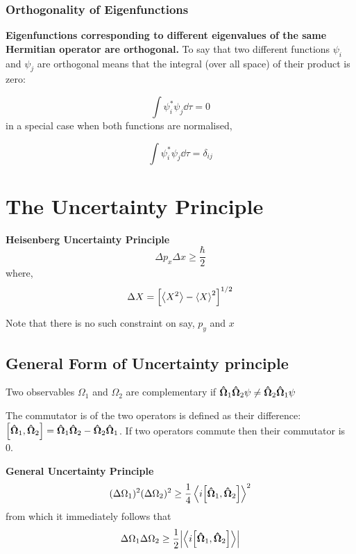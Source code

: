 \documentclass[11pt]{article}
\theoremstyle{definition}
\begin{document}
\subsubsection{Orthogonality of Eigenfunctions}
\textbf{Eigenfunctions corresponding to different eigenvalues of the same Hermitian operator are orthogonal.} To say that two different functions $\psi_i$ and $\psi_j$ are orthogonal means that the integral (over all space) of their product is zero:

\begin{equation*}
    \int \psi_i ^* \psi_j \dd{\tau} = 0
\end{equation*}
in a special case when both functions are normalised,

\begin{equation*}
    \int \psi_i ^* \psi_j \dd{\tau} = \delta_{ij}
\end{equation*}

\section{The Uncertainty Principle}
\begin{shaded}
\textbf{Heisenberg Uncertainty Principle}
\begin{equation*}
    \Delta p_x \Delta x \geq \frac{\hbar}{2}
\end{equation*}
where,
\begin{gather*}
     \Delta X = \left[\expval{X^2} - \expval{X}^2 \right]^{1/2}
\end{gather*}

Note that there is no such constraint on say, $p_y$ and $x$
\end{shaded}

\subsection{General Form of Uncertainty principle}

Two observables $\Omega_1$ and $\Omega_2$ are complementary if $\vectorunit{\Omega}_1 \vectorunit{\Omega}_2 \psi \neq  \vectorunit{\Omega}_2 \vectorunit{\Omega}_1 \psi$

The commutator is of the two operators is defined as their difference: $\comm{\vectorunit{\Omega}_1}{\vectorunit{\Omega}_2} = \vectorunit{\Omega}_1\vectorunit{\Omega}_2 - \vectorunit{\Omega}_2\vectorunit{\Omega}_1$. If two operators commute then their commutator is 0.

\begin{shaded}
\textbf{General Uncertainty Principle}
\begin{equation*}
    (\Delta \Omega_1)^2 (\Delta \Omega_2)^2 \geq \frac{1}{4} \expval{i \comm{\vectorunit{\Omega}_1}{\vectorunit{\Omega}_2}}^2
\end{equation*}
from which it immediately follows that
\begin{equation*}
    \Delta \Omega_1 \Delta \Omega_2 \geq \frac{1}{2} \abs{\expval{i \comm{\vectorunit{\Omega}_1}{\vectorunit{\Omega}_2}}}
\end{equation*}
\end{shaded}
\end{document}
